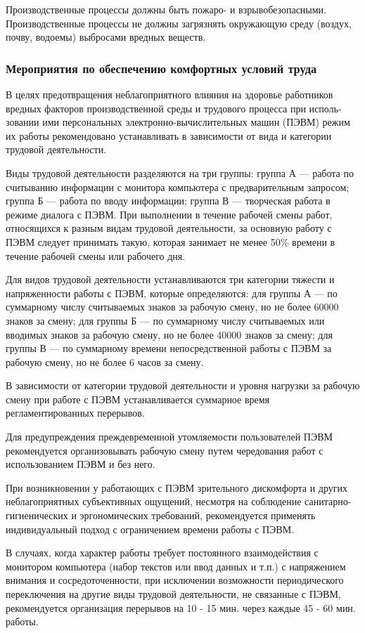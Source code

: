 Производственные процессы должны быть пожаро- и взрывобезопасными.
Производственные процессы не должны загрязнять окружающую среду (воздух, почву, водоемы) выбросами вредных веществ.

\subsubsection{Мероприятия по обеспечению комфортных условий труда}

В целях предотвращения неблагоприятного влияния на здоровье работников вредных факторов производственной среды и трудового процесса при исполь-зовании ими персональных электронно-вычислительных машин (ПЭВМ) режим их работы рекомендовано устанавливать в зависимости от вида и категории трудовой деятельности.

Виды трудовой деятельности разделяются на три группы: группа А --- работа по считыванию информации с монитора компьютера с предварительным запросом; группа Б --- работа по вводу информации; группа В --- творческая работа в режиме диалога с ПЭВМ. При выполнении в течение рабочей смены работ, относящихся к разным видам трудовой деятельности, за основную работу с ПЭВМ следует принимать такую, которая занимает не менее 50\% времени в течение рабочей смены или рабочего дня.

Для видов трудовой деятельности устанавливаются три категории тяжести и напряженности работы с ПЭВМ, которые определяются: для группы А --- по суммарному числу считываемых знаков за рабочую смену, но не более 60000 знаков за смену; для группы Б --- по суммарному числу считываемых или вводимых знаков за рабочую смену, но не более 40000 знаков за смену; для группы В --- по суммарному времени непосредственной работы с ПЭВМ за рабочую смену, но не более 6 часов за смену.

В зависимости от категории трудовой деятельности и уровня нагрузки за рабочую смену при работе с ПЭВМ устанавливается суммарное время регламентированных перерывов.

Для предупреждения преждевременной утомляемости пользователей ПЭВМ рекомендуется организовывать рабочую смену путем чередования работ с использованием ПЭВМ и без него.

При возникновении у работающих с ПЭВМ зрительного дискомфорта и других неблагоприятных субъективных ощущений, несмотря на соблюдение санитарно-гигиенических и эргономических требований, рекомендуется применять индивидуальный подход с ограничением времени работы с ПЭВМ.

В случаях, когда характер работы требует постоянного взаимодействия с монитором компьютера (набор текстов или ввод данных и т.п.) с напряжением внимания и сосредоточенности, при исключении возможности периодического переключения на другие виды трудовой деятельности, не связанные с ПЭВМ, рекомендуется организация перерывов на 10 - 15 мин. через каждые 45 - 60 мин. работы.

